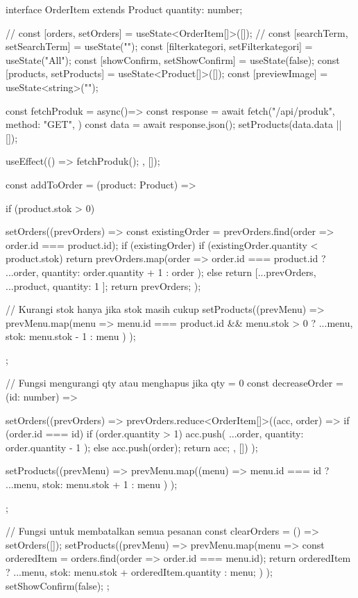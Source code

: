 {  interface OrderItem extends Product {
    quantity: number;
  }
  
  // const [orders, setOrders] = useState<OrderItem[]>([]);
  // const [searchTerm, setSearchTerm] = useState("");
  const [filterkategori, setFilterkategori] = useState("All");
  const [showConfirm, setShowConfirm] = useState(false);
  const [products, setProducts] = useState<Product[]>([]);
  const [previewImage] = useState<string>("");

  const fetchProduk = async()=> {
    const response = await fetch("/api/produk", {
      method: "GET", 
    })
    const data = await response.json();
    setProducts(data.data || []);
  }

   useEffect(() => {
      fetchProduk();
    }, []);

    const addToOrder = (product: Product) => {
      if (product.stok > 0) { 
        setOrders((prevOrders) => {
          const existingOrder = prevOrders.find(order => order.id === product.id);
          if (existingOrder) {
            if (existingOrder.quantity < product.stok) {
              return prevOrders.map(order =>
                order.id === product.id ? { ...order, quantity: order.quantity + 1 } : order
              );
            }
          } else {
            return [...prevOrders, { ...product, quantity: 1 }];
          }
          return prevOrders;
        });
    
        // Kurangi stok hanya jika stok masih cukup
        setProducts((prevMenu) =>
          prevMenu.map(menu =>
            menu.id === product.id && menu.stok > 0 ? { ...menu, stok: menu.stok - 1 } : menu
          )
        );
      }
    };
    

    // Fungsi mengurangi qty atau menghapus jika qty = 0
    const decreaseOrder = (id: number) => {
      setOrders((prevOrders) =>
        prevOrders.reduce<OrderItem[]>((acc, order) => {
          if (order.id === id) {
            if (order.quantity > 1) acc.push({ ...order, quantity: order.quantity - 1 });
          } else {
            acc.push(order);
          }
          return acc;
        }, [])
      );
    
      setProducts((prevMenu) =>
        prevMenu.map((menu) =>
          menu.id === id ? { ...menu, stok: menu.stok + 1 } : menu
        )
      );
    };    

  // Fungsi untuk membatalkan semua pesanan
  const clearOrders = () => {
    setOrders([]);
    setProducts((prevMenu) =>
      prevMenu.map(menu => {
        const orderedItem = orders.find(order => order.id === menu.id);
        return orderedItem ? { ...menu, stok: menu.stok + orderedItem.quantity } : menu;
      })
    );
    setShowConfirm(false);
  };

}
